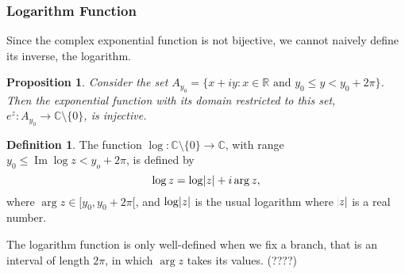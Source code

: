 \documentclass[12pt]{article}
\newcommand{\CC}{\mathbb{C}}
\newcommand{\RR}{\mathbb{R}}
\newtheorem{prop}{Proposition}[theorem]
\theoremstyle{definition}
\newtheorem{definition}{Definition}[section]
\DeclareMathOperator{\Ima}{Im}
\begin{document}
\subsubsection{Logarithm Function}
Since the complex exponential function is not bijective, we cannot naively define its inverse, the logarithm. 
\begin{prop}
	Consider the set $A_{y_0} = \{ x + iy : x \in \RR \text{ and } y_0 \leq y < y_0 + 2 \pi \}$.
	Then the exponential function with its domain restricted to this set, $e^z : A_{y_0} \to \CC \setminus \{ 0 \}$, is injective.  
\end{prop}
\begin{definition}
	The function $\log : \CC \setminus \{ 0 \} \to \CC$, with range $y_0 \leq \Ima \log z < y_o + 2 \pi$, is defined by
	\[
		\log z = \log \abs z + i \arg z,
	\]
	where $\arg z \in [y_0 , y_0 + 2 \pi[$, and $\log \abs z$ is the usual logarithm where $\abs z$ is a real number.	
\end{definition}
The logarithm function is only well-defined when we fix a branch, that is an interval of length $2\pi$, in which $\arg z$ takes its values. (????)
\end{document}
